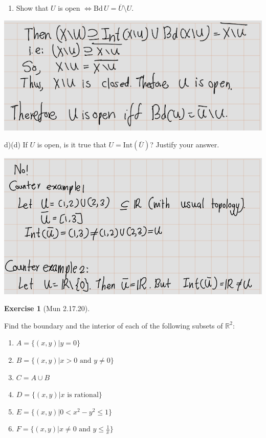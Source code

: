 \documentclass[
]{book}
\providecommand{\tightlist}{%
  \setlength{\itemsep}{0pt}\setlength{\parskip}{0pt}}
\theoremstyle{definition}
\theoremstyle{definition}
\theoremstyle{definition}
\newtheorem{exercise}{Exercise}[chapter]
\theoremstyle{definition}
\theoremstyle{remark}
\begin{document}
\begin{enumerate}
\def\labelenumi{(\alph{enumi})}
\setcounter{enumi}{2}
\tightlist
\item
  Show that \(U\) is open \(\Leftrightarrow \text{Bd} \, U = \overline{U} \setminus U\).
\end{enumerate}

\includegraphics{figures/Exercises/Ex 2.17/ex-19-5.png}

d)(d) If \(U\) is open, is it true that \(U = \text{Int}(\overline{U})\)? Justify your answer.

\includegraphics{figures/Exercises/Ex 2.17/ex-19-6.png}

\begin{exercise}[Mun 2.17.20]
\protect\hypertarget{exr:unnamed-chunk-182}{}\label{exr:unnamed-chunk-182}

Find the boundary and the interior of each of the following subsets of \(\mathbb{R}^2\):

\begin{enumerate}
\def\labelenumi{(\alph{enumi})}
\tightlist
\item
  \(A = \{(x, y) | y = 0\}\)
\item
  \(B = \{(x, y) | x > 0 \text{ and } y \neq 0\}\)
\item
  \(C = A \cup B\)
\item
  \(D = \{(x, y) | x \text{ is rational}\}\)
\item
  \(E = \{(x, y) | 0 < x^2 - y^2 \leq 1\}\)
\item
  \(F = \{(x, y) | x \neq 0 \text{ and } y \leq \frac{1}{x}\}\)
\end{enumerate}

\end{exercise}
\end{document}
